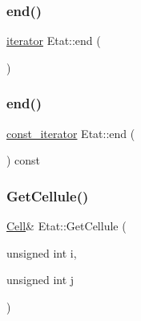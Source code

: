 \mbox{\label{class_etat_a20bb403d8e9e056511559ecd2090c458}} 
\subsubsection{\texorpdfstring{end()}{end()}\hspace{0.1cm}{\footnotesize\ttfamily [1/2]}}
{\footnotesize\ttfamily \mbox{\hyperlink{class_etat_1_1iterator}{iterator}} Etat\+::end (\begin{DoxyParamCaption}{ }\end{DoxyParamCaption})\hspace{0.3cm}{\ttfamily [inline]}}

\mbox{\label{class_etat_a513101fc8bbb4b60e69b36013fc2b126}} 
\subsubsection{\texorpdfstring{end()}{end()}\hspace{0.1cm}{\footnotesize\ttfamily [2/2]}}
{\footnotesize\ttfamily \mbox{\hyperlink{class_etat_1_1const__iterator}{const\+\_\+iterator}} Etat\+::end (\begin{DoxyParamCaption}{ }\end{DoxyParamCaption}) const\hspace{0.3cm}{\ttfamily [inline]}}

\mbox{\label{class_etat_acff1910bf647fb62c9f4d9e726be7290}} 
\subsubsection{\texorpdfstring{Get\+Cellule()}{GetCellule()}\hspace{0.1cm}{\footnotesize\ttfamily [1/2]}}
{\footnotesize\ttfamily \mbox{\hyperlink{class_cell}{Cell}}\& Etat\+::\+Get\+Cellule (\begin{DoxyParamCaption}\item[{unsigned int}]{i,  }\item[{unsigned int}]{j }\end{DoxyParamCaption})\hspace{0.3cm}{\ttfamily [inline]}}

